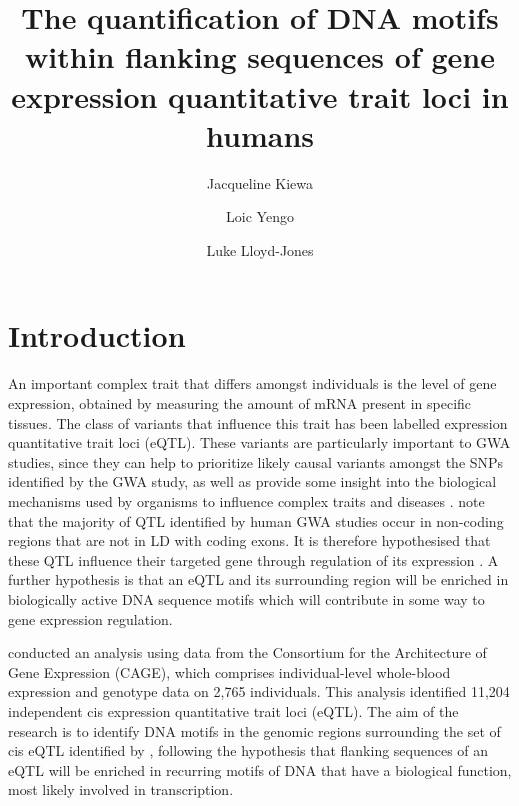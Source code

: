 \documentclass[12pt, onecolumn, oneside]{gsajnl}
\title{The quantification of DNA motifs within flanking sequences of gene expression quantitative trait loci in humans}
\author[1]{Jacqueline Kiewa}
\author[1]{Loic Yengo}
\author[1]{Luke Lloyd-Jones}
\affil[1]{Institute for Molecular Bioscience, University of Queensland, Brisbane, Queensland 4072, Australia}
\begin{document}
\doublespacing
\maketitle



\clearpage
\section{Introduction}

An important complex trait that differs amongst individuals is the level of gene expression, obtained by measuring the amount of mRNA present in specific tissues. The class of variants that influence this trait has been labelled expression quantitative trait loci (eQTL). These variants are particularly important to GWA studies, since they can help to prioritize likely causal variants amongst the SNPs identified by the GWA study, as well as provide some insight into the biological mechanisms used by organisms to influence complex traits and diseases \citep{albert2015role}. \citet{albert2015role} note that the majority of QTL identified by human GWA studies occur in non-coding regions that are not in LD with coding exons. It is therefore hypothesised that these QTL influence their targeted gene through regulation of its expression \citep{nica2013expression}. A further hypothesis is that an eQTL and its surrounding region will be enriched in biologically active DNA sequence motifs which will contribute in some way to gene expression regulation. 

\citet{lloyd2017genetic} conducted an analysis using data from the Consortium for the Architecture of Gene Expression (CAGE), which comprises individual-level whole-blood expression and genotype data on 2,765 individuals. This analysis identified 11,204  independent cis expression quantitative trait loci (eQTL). The aim of the research is to identify DNA motifs in the genomic regions surrounding the set of cis eQTL identified by \citet{lloyd2017genetic}, following the hypothesis that flanking sequences of an eQTL will be enriched in recurring motifs of DNA that have a biological function, most likely involved in transcription.
\end{document}
